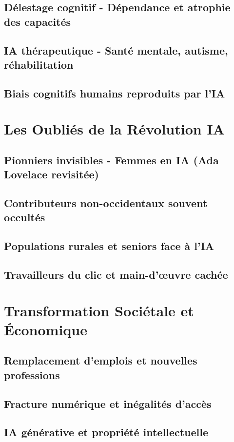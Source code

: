 \documentclass[12pt,a4paper]{book}
\begin{document}
\section{Délestage cognitif - Dépendance et atrophie des capacités}
\section{IA thérapeutique - Santé mentale, autisme, réhabilitation}
\section{Biais cognitifs humains reproduits par l'IA}

\chapter{Les Oubliés de la Révolution IA}
\section{Pionniers invisibles - Femmes en IA (Ada Lovelace revisitée)}
\section{Contributeurs non-occidentaux souvent occultés}
\section{Populations rurales et seniors face à l'IA}
\section{Travailleurs du clic et main-d'œuvre cachée}

\chapter{Transformation Sociétale et Économique}
\section{Remplacement d'emplois et nouvelles professions}
\section{Fracture numérique et inégalités d'accès}
\section{IA générative et propriété intellectuelle}
\end{document}
